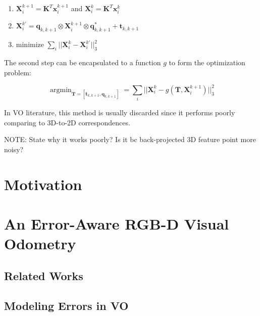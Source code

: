\documentclass[a4paper]{report}
\numberwithin{figure}{section}
\newcommand{\argmin}{\mathop{\mathrm{argmin}}}
\begin{document}
\begin{enumerate}
  \item $\mathbf{X}_{i}^{k+1} = \mathbf{K}^T\mathbf{x}_{i}^{k+1}$ and 
    $\mathbf{X}_{i}^{k} = \mathbf{K}^T\mathbf{x}_{i}^{k}$ 
  \item $\mathbf{X}_i^{k'} = 
    \mathbf{q}_{k,k+1} \otimes \mathbf{X}_i^{k+1} \otimes \mathbf{q}_{k,k+1}^* + \mathbf{t}_{k,k+1}$
  \item minimize $\sum_i||\mathbf{X}_i^k - \mathbf{X}_i^{k'}||_3^2$
\end{enumerate}

The second step can be encapsulated to a function $g$ to form the optimization 
problem:

\begin{equation}
  \argmin_{\mathbf{T} = [\mathbf{t}_{k,k+1}, \mathbf{q}_{k,k+1}]} = 
  \sum_i||\mathbf{X}_i^k - g(\mathbf{T}, \mathbf{X}_i^{k+1})||^2_3
\end{equation}

In VO literature, this method is usually discarded since 
it performs poorly comparing to 3D-to-2D correspondences.

NOTE: State why it works poorly? Is it bc back-projected 3D feature point more noisy?

\chapter{Motivation} \label{cp_motivation}

\chapter{An Error-Aware RGB-D Visual Odometry} \label{cp_covo}

\section{Related Works} \label{sc_error_aware_visual_odometry_related_works}

\section{Modeling Errors in VO} \label{sc_spatial_uncertainty}
\end{document}

